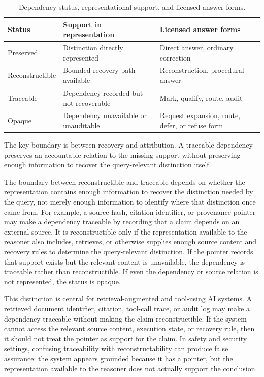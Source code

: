 \documentclass[11pt]{article}
\begin{document}
\begin{table}[h]
\centering
\caption{Dependency status, representational support, and licensed answer forms.}
\label{tab:dependency_status_answer_forms}
\begin{tabular}{lll}
\toprule
\textbf{Status} & \textbf{Support in representation} & \textbf{Licensed answer forms} \\
\midrule
Preserved & Distinction directly represented & Direct answer, ordinary correction \\
Reconstructible & Bounded recovery path available & Reconstruction, procedural answer \\
Traceable & Dependency recorded but not recoverable & Mark, qualify, route, audit \\
Opaque & Dependency unavailable or unauditable & Request expansion, route, defer, or refuse form \\
\bottomrule
\end{tabular}
\end{table}

The key boundary is between recovery and attribution. A traceable dependency preserves an accountable relation to the missing support without preserving enough information to recover the query-relevant distinction itself.

The boundary between reconstructible and traceable depends on whether the representation contains enough information to recover the distinction needed by the query, not merely enough information to identify where that distinction once came from. For example, a source hash, citation identifier, or provenance pointer may make a dependency traceable by recording that a claim depends on an external source. It is reconstructible only if the representation available to the reasoner also includes, retrieves, or otherwise supplies enough source content and recovery rules to determine the query-relevant distinction. If the pointer records that support exists but the relevant content is unavailable, the dependency is traceable rather than reconstructible. If even the dependency or source relation is not represented, the status is opaque.

This distinction is central for retrieval-augmented and tool-using AI systems. A retrieved document identifier, citation, tool-call trace, or audit log may make a dependency traceable without making the claim reconstructible. If the system cannot access the relevant source content, execution state, or recovery rule, then it should not treat the pointer as support for the claim. In safety and security settings, confusing traceability with reconstructability can produce false assurance: the system appears grounded because it has a pointer, but the representation available to the reasoner does not actually support the conclusion.
\end{document}
